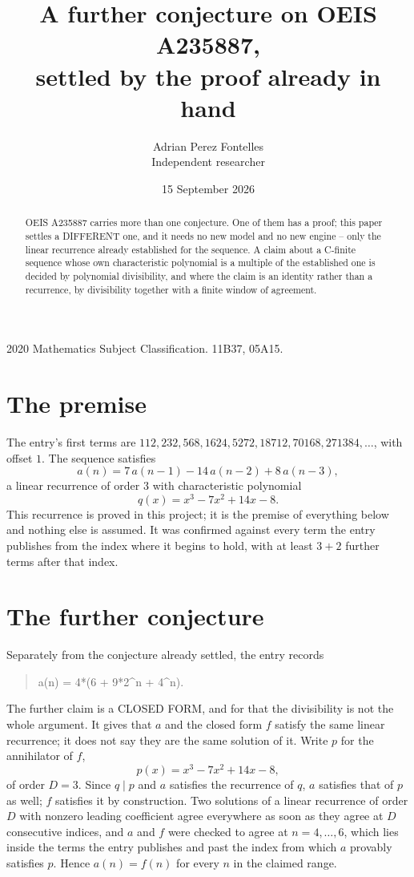 \documentclass[11pt,a4paper]{article}
\title{A further conjecture on OEIS A235887,\\ \large settled by the proof already in hand}
\author{Adrian Perez Fontelles\\ \small Independent researcher}
\date{15 September 2026}
\theoremstyle{plain}
\theoremstyle{definition}
\begin{document}
\maketitle

\begin{abstract}
OEIS A235887 carries more than one conjecture. One of them has a proof; this paper settles a
DIFFERENT one, and it needs no new model and no new engine -- only the linear recurrence already
established for the sequence. A claim about a C-finite sequence whose own characteristic
polynomial is a multiple of the established one is decided by polynomial divisibility, and where
the claim is an identity rather than a recurrence, by divisibility together with a finite window
of agreement.
\end{abstract}

\noindent\small 2020 Mathematics Subject Classification. 11B37, 05A15.\normalsize

\section{The premise}

The entry's first terms are $112, 232, 568, 1624, 5272, 18712, 70168, 271384,\dots$, with offset $1$. The sequence satisfies
\[
  a(n)=7\,a(n-1) - 14\,a(n-2) + 8\,a(n-3) ,
\]
a linear recurrence of order $3$ with characteristic polynomial
\[
  q(x)=x^{3} - 7 x^{2} + 14 x - 8 .
\]
This recurrence is proved in this project; it is the premise of everything below and nothing else is assumed.
It was confirmed against every term the entry publishes from the index where it begins to hold,
with at least $3+2$ further terms after that index.

\section{The further conjecture}

Separately from the conjecture already settled, the entry records

\begin{quote}\raggedright a(n) = 4*(6 + 9*2\^{}n + 4\^{}n).\end{quote}

The further claim is a CLOSED FORM, and for that the divisibility is not the whole argument. It
gives that $a$ and the closed form $f$ satisfy the same linear recurrence; it does not say they
are the same solution of it. Write $p$ for the annihilator of $f$,
\[
  p(x)=x^{3} - 7 x^{2} + 14 x - 8 ,
\]
of order $D=3$. Since $q\mid p$ and $a$ satisfies the recurrence of $q$, $a$ satisfies that of
$p$ as well; $f$ satisfies it by construction. Two solutions of a linear recurrence of order $D$
with nonzero leading coefficient agree everywhere as soon as they agree at $D$ consecutive
indices, and $a$ and $f$ were checked to agree at $n=4,\dots,6$,
which lies inside the terms the entry publishes and past the index from which $a$ provably
satisfies $p$. Hence $a(n)=f(n)$ for every $n$ in the claimed range.
\end{document}

